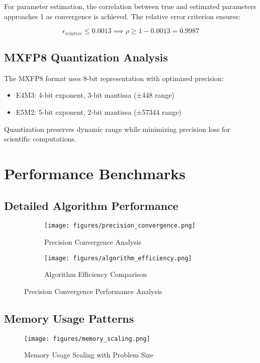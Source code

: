 \documentclass[11pt,a4paper]{article}
\begin{document}
For parameter estimation, the correlation between true and estimated parameters approaches 1 as convergence is achieved. The relative error criterion ensures:

\[\epsilon_{relative} \leq 0.0013 \implies \rho \geq 1 - 0.0013 = 0.9987\]

\subsection{MXFP8 Quantization Analysis}

The MXFP8 format uses 8-bit representation with optimized precision:

\begin{itemize}
    \item E4M3: 4-bit exponent, 3-bit mantissa (±448 range)
    \item E5M2: 5-bit exponent, 2-bit mantissa (±57344 range)
\end{itemize}

Quantization preserves dynamic range while minimizing precision loss for scientific computations.

\section{Performance Benchmarks}

\subsection{Detailed Algorithm Performance}

\begin{figure}[H]
\centering
\begin{subfigure}{0.45\textwidth}
    \texttt{[image: figures/precision\_convergence.png]}
    \caption{Precision Convergence Analysis}
    \label{fig:precision_convergence}
\end{subfigure}
\hfill
\begin{subfigure}{0.45\textwidth}
    \texttt{[image: figures/algorithm\_efficiency.png]}
    \caption{Algorithm Efficiency Comparison}
    \label{fig:algorithm_efficiency}
\end{subfigure}
\caption{Precision Convergence Performance Analysis}
\label{fig:performance_analysis}
\end{figure}

\subsection{Memory Usage Patterns}

\begin{figure}[H]
\centering
\texttt{[image: figures/memory\_scaling.png]}
\caption{Memory Usage Scaling with Problem Size}
\label{fig:memory_scaling}
\end{figure}
\end{document}
